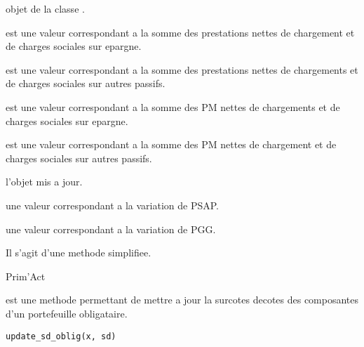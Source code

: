 \documentclass[a4paper]{book}
\begin{document}
%
\begin{Arguments}
\begin{ldescription}
\item[\code{x}] objet de la classe .

\item[\code{prest\_ep}] est une valeur  correspondant a la somme des prestations nettes de chargement et
de charges sociales sur epargne.

\item[\code{prest\_autres}] est une valeur  correspondant a la somme des prestations nettes
de chargements et de charges sociales sur autres passifs.

\item[\code{pm\_ep}] est une valeur   correspondant a la somme des PM nettes de chargements et
de charges sociales sur epargne.

\item[\code{pm\_autres}] est une valeur  correspondant a la somme des PM nettes de chargement et
de charges sociales sur autres passifs.
\end{ldescription}
\end{Arguments}
%
\begin{Value}
 l'objet   mis a jour.

 une valeur  correspondant a la variation de PSAP.

 une valeur  correspondant a la variation de PGG.
\end{Value}
%
\begin{Note}\relax
Il s'agit d'une methode simplifiee.
\end{Note}
%
\begin{Author}\relax
Prim'Act
\end{Author}
%
\begin{Description}\relax
{} est une methode permettant de mettre a jour la surcotes decotes des composantes d'un portefeuille obligataire.
\end{Description}
%
\begin{Usage}
\begin{verbatim}
update_sd_oblig(x, sd)
\end{verbatim}
\end{Usage}
\end{document}
